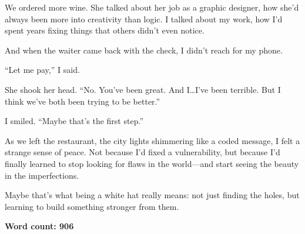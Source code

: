 \documentclass{article}
\theoremstyle{plain}
\theoremstyle{definition}
\theoremstyle{remark}
\begin{document}
\begin{tcolorbox}[colback=green!3, colframe=green!40!black, title=\textbf{RcRL (Ours)}, fonttitle=\bfseries, left=2mm, right=2mm, breakable]
We ordered more wine. She talked about her job as a graphic designer, how she’d always been more into creativity than logic. I talked about my work, how I’d spent years fixing things that others didn’t even notice.

And when the waiter came back with the check, I didn’t reach for my phone.

``Let me pay,'' I said.

She shook her head. ``No. You’ve been great. And I\dots I’ve been terrible. But I think we’ve both been trying to be better.''

I smiled. ``Maybe that’s the first step.''

As we left the restaurant, the city lights shimmering like a coded message, I felt a strange sense of peace. Not because I’d fixed a vulnerability, but because I’d finally learned to stop looking for flaws in the world—and start seeing the beauty in the imperfections.

Maybe that’s what being a white hat really means: not just finding the holes, but learning to build something stronger from them.

\vspace{0.5em}

\textbf{Word count: 906}
\end{tcolorbox}
\end{document}
